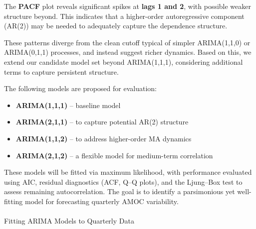 \documentclass[
  11pt,
]{article}
\makeatletter
\let\oldparagraph\paragraph
\renewcommand{\paragraph}{
    \@ifstar
      \xxxParagraphStar
      \xxxParagraphNoStar
  }
\newcommand{\xxxParagraphStar}[1]{\oldparagraph*{#1}\mbox{}}
\newcommand{\xxxParagraphNoStar}[1]{\oldparagraph{#1}\mbox{}}
\makeatother
\begin{document}
The \textbf{PACF} plot reveals significant spikes at \textbf{lags 1 and
2}, with possible weaker structure beyond. This indicates that a
higher-order autoregressive component (AR(2)) may be needed to
adequately capture the dependence structure.

These patterns diverge from the clean cutoff typical of simpler
ARIMA(1,1,0) or ARIMA(0,1,1) processes, and instead suggest richer
dynamics. Based on this, we extend our candidate model set beyond
ARIMA(1,1,1), considering additional terms to capture persistent
structure.

The following models are proposed for evaluation:

\begin{itemize}
\item
  \textbf{ARIMA(1,1,1)} -- baseline model
\item
  \textbf{ARIMA(2,1,1)} -- to capture potential AR(2) structure
\item
  \textbf{ARIMA(1,1,2)} -- to address higher-order MA dynamics
\item
  \textbf{ARIMA(2,1,2)} -- a flexible model for medium-term correlation
\end{itemize}

These models will be fitted via maximum likelihood, with performance
evaluated using AIC, residual diagnostics (ACF, Q--Q plots), and the
Ljung--Box test to assess remaining autocorrelation. The goal is to
identify a parsimonious yet well-fitting model for forecasting quarterly
AMOC variability.

\paragraph{Fitting ARIMA Models to Quarterly
Data}\label{fitting-arima-models-to-quarterly-data}
\end{document}
